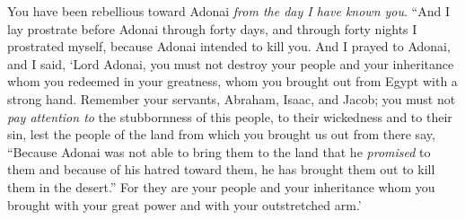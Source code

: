 \begin{biblechapter}
\verse You have been rebellious toward Adonai \textit{from the day I have known you}.
\verse “And I lay prostrate before Adonai through forty days, and through forty nights I prostrated myself, because Adonai intended to kill you.
\verse And I prayed to Adonai, and I said, ‘Lord Adonai, you must not destroy your people and your inheritance whom you redeemed in your greatness, whom you brought out from Egypt with a strong hand.
\verse Remember your servants, Abraham, Isaac, and Jacob; you must not \textit{pay attention to} the stubbornness of this people, to their wickedness and to their sin,
\verse lest the people of the land from which you brought us out from there say, “Because Adonai was not able to bring them to the land that he \textit{promised} to them and because of his hatred toward them, he has brought them out to kill them in the desert.”
\verse For they are your people and your inheritance whom you brought with your great power and with your outstretched arm.’
\end{biblechapter}


